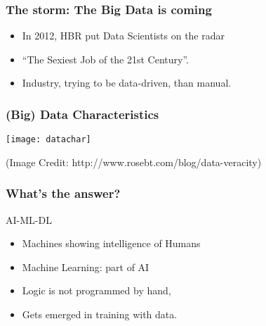 \begin{frame}[fragile]\frametitle{The storm: The Big Data is coming}
\begin{itemize}
\item In 2012, HBR put Data Scientists on the radar
\item ``The Sexiest Job of the 21st Century''.
\item Industry, trying to be data-driven, than manual.
\end{itemize}
\end{frame}



\begin{frame}[fragile] \frametitle{(Big) Data Characteristics}
\begin{center}
\texttt{[image: datachar]}
\end{center}
{\tiny (Image Credit: http://www.rosebt.com/blog/data-veracity)}
\end{frame}


\begin{frame}[fragile]\frametitle{What's the answer?}
AI-ML-DL
\begin{itemize}
\item Machines showing intelligence of Humans
\item Machine Learning: part of AI
\item Logic is not programmed by hand, 
\item Gets emerged in training with data.
\end{itemize}
\end{frame}

